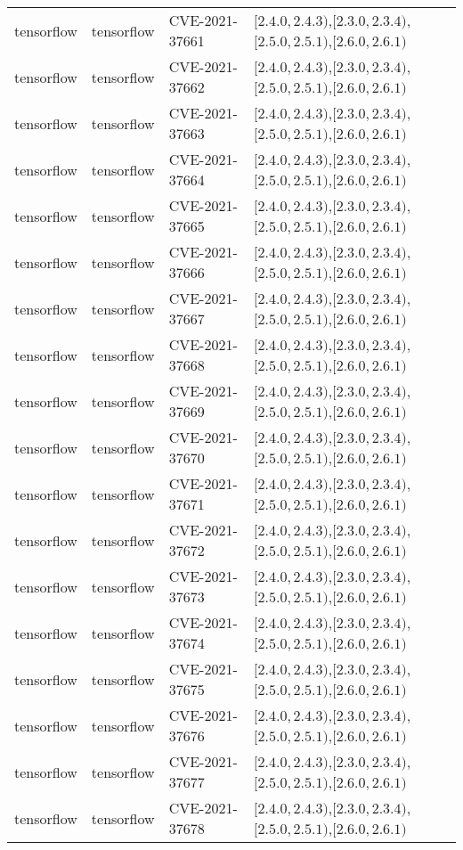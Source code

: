 \begin{tabular}{llll}
tensorflow & tensorflow & CVE-2021-37661 & $[2.4.0,2.4.3)$,$[2.3.0,2.3.4)$,$[2.5.0,2.5.1)$,$[2.6.0,2.6.1)$ \\
tensorflow & tensorflow & CVE-2021-37662 & $[2.4.0,2.4.3)$,$[2.3.0,2.3.4)$,$[2.5.0,2.5.1)$,$[2.6.0,2.6.1)$ \\
tensorflow & tensorflow & CVE-2021-37663 & $[2.4.0,2.4.3)$,$[2.3.0,2.3.4)$,$[2.5.0,2.5.1)$,$[2.6.0,2.6.1)$ \\
tensorflow & tensorflow & CVE-2021-37664 & $[2.4.0,2.4.3)$,$[2.3.0,2.3.4)$,$[2.5.0,2.5.1)$,$[2.6.0,2.6.1)$ \\
tensorflow & tensorflow & CVE-2021-37665 & $[2.4.0,2.4.3)$,$[2.3.0,2.3.4)$,$[2.5.0,2.5.1)$,$[2.6.0,2.6.1)$ \\
tensorflow & tensorflow & CVE-2021-37666 & $[2.4.0,2.4.3)$,$[2.3.0,2.3.4)$,$[2.5.0,2.5.1)$,$[2.6.0,2.6.1)$ \\
tensorflow & tensorflow & CVE-2021-37667 & $[2.4.0,2.4.3)$,$[2.3.0,2.3.4)$,$[2.5.0,2.5.1)$,$[2.6.0,2.6.1)$ \\
tensorflow & tensorflow & CVE-2021-37668 & $[2.4.0,2.4.3)$,$[2.3.0,2.3.4)$,$[2.5.0,2.5.1)$,$[2.6.0,2.6.1)$ \\
tensorflow & tensorflow & CVE-2021-37669 & $[2.4.0,2.4.3)$,$[2.3.0,2.3.4)$,$[2.5.0,2.5.1)$,$[2.6.0,2.6.1)$ \\
tensorflow & tensorflow & CVE-2021-37670 & $[2.4.0,2.4.3)$,$[2.3.0,2.3.4)$,$[2.5.0,2.5.1)$,$[2.6.0,2.6.1)$ \\
tensorflow & tensorflow & CVE-2021-37671 & $[2.4.0,2.4.3)$,$[2.3.0,2.3.4)$,$[2.5.0,2.5.1)$,$[2.6.0,2.6.1)$ \\
tensorflow & tensorflow & CVE-2021-37672 & $[2.4.0,2.4.3)$,$[2.3.0,2.3.4)$,$[2.5.0,2.5.1)$,$[2.6.0,2.6.1)$ \\
tensorflow & tensorflow & CVE-2021-37673 & $[2.4.0,2.4.3)$,$[2.3.0,2.3.4)$,$[2.5.0,2.5.1)$,$[2.6.0,2.6.1)$ \\
tensorflow & tensorflow & CVE-2021-37674 & $[2.4.0,2.4.3)$,$[2.3.0,2.3.4)$,$[2.5.0,2.5.1)$,$[2.6.0,2.6.1)$ \\
tensorflow & tensorflow & CVE-2021-37675 & $[2.4.0,2.4.3)$,$[2.3.0,2.3.4)$,$[2.5.0,2.5.1)$,$[2.6.0,2.6.1)$ \\
tensorflow & tensorflow & CVE-2021-37676 & $[2.4.0,2.4.3)$,$[2.3.0,2.3.4)$,$[2.5.0,2.5.1)$,$[2.6.0,2.6.1)$ \\
tensorflow & tensorflow & CVE-2021-37677 & $[2.4.0,2.4.3)$,$[2.3.0,2.3.4)$,$[2.5.0,2.5.1)$,$[2.6.0,2.6.1)$ \\
tensorflow & tensorflow & CVE-2021-37678 & $[2.4.0,2.4.3)$,$[2.3.0,2.3.4)$,$[2.5.0,2.5.1)$,$[2.6.0,2.6.1)$ \\

\end{tabular}
